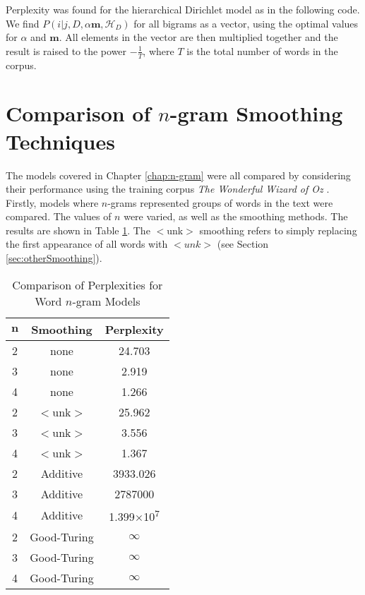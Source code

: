 Perplexity was found for the hierarchical Dirichlet model as in the following code. We find $P(i|j,D,\alpha\boldsymbol{m},\mathscr{H}_{D})$ for all bigrams as a vector, using the optimal values for $\alpha$ and $\boldsymbol{m}$. All elements in the vector are then multiplied together and the result is raised to the power $-\frac{1}{T}$, where $T$ is the total number of words in the corpus.




\section{Comparison of $n$-gram Smoothing Techniques}

The models covered in Chapter \ref{chap:n-gram} were all compared by considering their performance using the training corpus \textit{The Wonderful Wizard of Oz} \cite{baum2008wonderful}. Firstly, models where $n$-grams represented groups of words in the text were compared. The values of $n$ were varied, as well as the smoothing methods. The results are shown in Table \ref{table:wordNGram}. The $<$unk$>$ smoothing refers to simply replacing the first appearance of all words with $<unk>$ (see Section \ref{sec:otherSmoothing}).

\begin{table}[h!]
\caption{Comparison of Perplexities for Word $n$-gram Models}
\label{table:wordNGram}
\begin{center}
    \begin{tabular}{|c| c| c|}
    \hline
    $\boldsymbol{n}$ & \textbf{Smoothing} & \textbf{Perplexity} \\ \hline
    2 & none & 24.703 \\ \hline
    3 & none & 2.919 \\ \hline
    4 & none & 1.266 \\ \hline
    2 & $<$unk$>$ & 25.962 \\ \hline
    3 & $<$unk$>$ & 3.556 \\ \hline
    4 & $<$unk$>$ & 1.367 \\ \hline
    2 & Additive & 3933.026 \\ \hline
    3 & Additive & 2787000 \\ \hline
    4 & Additive & 1.399$\times$10\textsuperscript{7} \\ \hline
    2 & Good-Turing & $\infty$ \\ \hline
    3 & Good-Turing & $\infty$ \\ \hline
    4 & Good-Turing& $\infty$ \\ \hline
    \end{tabular}
    \end{center}
    \end{table}


